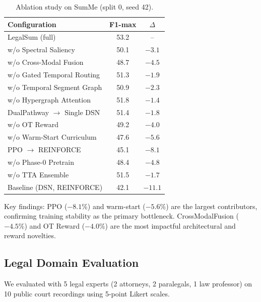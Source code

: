 \documentclass[letterpaper]{article}
\begin{document}
\begin{table}[t]
\centering
\small
\caption{Ablation study on SumMe (split 0, seed 42).}
\label{tab:ablation}
\begin{tabular*}{\columnwidth}{l@{\extracolsep{\fill}}cc}
\toprule
\textbf{Configuration} & \textbf{F1-max} & \textbf{$\Delta$} \\
\midrule
LegalSum (full)                          & 53.2 & -- \\
\midrule
w/o Spectral Saliency                    & 50.1 & $-3.1$ \\
w/o Cross-Modal Fusion                   & 48.7 & $-4.5$ \\
w/o Gated Temporal Routing               & 51.3 & $-1.9$ \\
w/o Temporal Segment Graph               & 50.9 & $-2.3$ \\
w/o Hypergraph Attention                 & 51.8 & $-1.4$ \\
DualPathway $\rightarrow$ Single DSN     & 51.4 & $-1.8$ \\
\midrule
w/o OT Reward                            & 49.2 & $-4.0$ \\
w/o Warm-Start Curriculum                & 47.6 & $-5.6$ \\
PPO $\rightarrow$ REINFORCE              & 45.1 & $-8.1$ \\
w/o Phase-0 Pretrain                     & 48.4 & $-4.8$ \\
w/o TTA Ensemble                         & 51.5 & $-1.7$ \\
\midrule
Baseline (DSN, REINFORCE)                & 42.1 & $-11.1$ \\
\bottomrule
\end{tabular*}
\end{table}

Key findings: PPO ($-8.1\%$) and warm-start ($-5.6\%$) are the largest
contributors, confirming training stability as the primary bottleneck.
CrossModalFusion ($-4.5\%$) and OT Reward ($-4.0\%$) are the most impactful
architectural and reward novelties.

\subsection{Legal Domain Evaluation}

We evaluated with 5 legal experts (2 attorneys, 2 paralegals, 1 law professor)
on 10 public court recordings using 5-point Likert scales.
\end{document}
